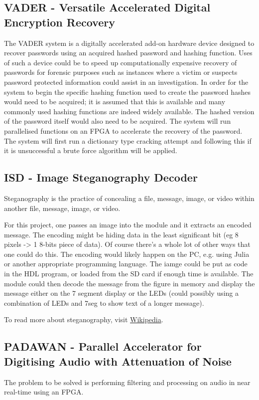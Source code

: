 \subsection{VADER - Versatile Accelerated Digital Encryption Recovery}
The VADER system is a digitally accelerated add-on hardware device designed to recover passwords using an acquired hashed password and hashing function. Uses of such a device could be to speed up computationally expensive recovery of passwords for forensic purposes such as instances where a victim or suspects password protected information could assist in an investigation. In order for the system to begin the specific hashing function used to create the password hashes would need to be acquired; it is assumed that this is available and many commonly used hashing functions are indeed widely available. The hashed version of the password itself would also need to be acquired. The system will run parallelised functions on an FPGA to accelerate the recovery of the password. The system will first run a dictionary type cracking attempt and following this if it is unsuccessful a brute force algorithm will be applied.

\subsection{ISD - Image Steganography Decoder}
Steganography is the practice of concealing a file, message, image, or video within another file, message, image, or video.

For this project, one passes an image into the module and it extracts an encoded message. The encoding might be hiding data in the least significant bit  (eg 8 pixels -> 1 8-bits piece of data). Of course there's a whole lot of other ways that one could do this. The encoding would likely happen on the PC, e.g. using Julia or another appropriate programming language. The iamge could be put as code in the HDL program, or loaded from the SD card if enough time is available. The module could then decode the message from the figure in memory and display the message either on the 7 segment display or the LEDs (could possibly using a combination of LEDs and 7seg to show text of a longer message).

To read more about steganography, visit \href{https://en.wikipedia.org/wiki/Steganography}{Wikipedia}.

\subsection{PADAWAN - Parallel Accelerator for Digitising Audio with Attenuation of Noise}
The problem to be solved is performing filtering and processing on audio in near real-time using an FPGA.

